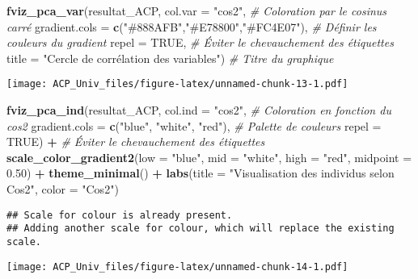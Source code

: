 \documentclass[
]{article}
\newenvironment{Shaded}{\begin{snugshade}}{\end{snugshade}}
\newcommand{\AttributeTok}[1]{\textcolor[rgb]{0.13,0.29,0.53}{#1}}
\newcommand{\CommentTok}[1]{\textcolor[rgb]{0.56,0.35,0.01}{\textit{#1}}}
\newcommand{\ConstantTok}[1]{\textcolor[rgb]{0.56,0.35,0.01}{#1}}
\newcommand{\FloatTok}[1]{\textcolor[rgb]{0.00,0.00,0.81}{#1}}
\newcommand{\FunctionTok}[1]{\textcolor[rgb]{0.13,0.29,0.53}{\textbf{#1}}}
\newcommand{\NormalTok}[1]{#1}
\newcommand{\SpecialCharTok}[1]{\textcolor[rgb]{0.81,0.36,0.00}{\textbf{#1}}}
\newcommand{\StringTok}[1]{\textcolor[rgb]{0.31,0.60,0.02}{#1}}
\begin{document}
\begin{Shaded}
\begin{Highlighting}[]
\FunctionTok{fviz\_pca\_var}\NormalTok{(resultat\_ACP,}
             \AttributeTok{col.var =} \StringTok{"cos2"}\NormalTok{, }\CommentTok{\# Coloration par le cosinus carré}
             \AttributeTok{gradient.cols =} \FunctionTok{c}\NormalTok{(}\StringTok{"\#888AFB"}\NormalTok{,}\StringTok{"\#E78800"}\NormalTok{,}\StringTok{"\#FC4E07"}\NormalTok{), }\CommentTok{\# Définir les couleurs du gradient}
             \AttributeTok{repel =} \ConstantTok{TRUE}\NormalTok{, }\CommentTok{\# Éviter le chevauchement des étiquettes}
             \AttributeTok{title =} \StringTok{"Cercle de corrélation des variables"}\NormalTok{) }\CommentTok{\# Titre du graphique}
\end{Highlighting}
\end{Shaded}

\texttt{[image: ACP\_Univ\_files/figure-latex/unnamed-chunk-13-1.pdf]}

\begin{Shaded}
\begin{Highlighting}[]
\FunctionTok{fviz\_pca\_ind}\NormalTok{(resultat\_ACP, }
             \AttributeTok{col.ind =} \StringTok{"cos2"}\NormalTok{,  }\CommentTok{\# Coloration en fonction du cos2}
             \AttributeTok{gradient.cols =} \FunctionTok{c}\NormalTok{(}\StringTok{"blue"}\NormalTok{, }\StringTok{"white"}\NormalTok{, }\StringTok{"red"}\NormalTok{),  }\CommentTok{\# Palette de couleurs}
             \AttributeTok{repel =} \ConstantTok{TRUE}\NormalTok{) }\SpecialCharTok{+}  \CommentTok{\# Éviter le chevauchement des étiquettes}
  \FunctionTok{scale\_color\_gradient2}\NormalTok{(}\AttributeTok{low =} \StringTok{"blue"}\NormalTok{, }\AttributeTok{mid =} \StringTok{"white"}\NormalTok{, }\AttributeTok{high =} \StringTok{"red"}\NormalTok{, }\AttributeTok{midpoint =} \FloatTok{0.50}\NormalTok{) }\SpecialCharTok{+}
  \FunctionTok{theme\_minimal}\NormalTok{() }\SpecialCharTok{+}
  \FunctionTok{labs}\NormalTok{(}\AttributeTok{title =} \StringTok{"Visualisation des individus selon Cos2"}\NormalTok{,}
       \AttributeTok{color =} \StringTok{"Cos2"}\NormalTok{)}
\end{Highlighting}
\end{Shaded}

\begin{verbatim}
## Scale for colour is already present.
## Adding another scale for colour, which will replace the existing scale.
\end{verbatim}

\texttt{[image: ACP\_Univ\_files/figure-latex/unnamed-chunk-14-1.pdf]}
\end{document}
